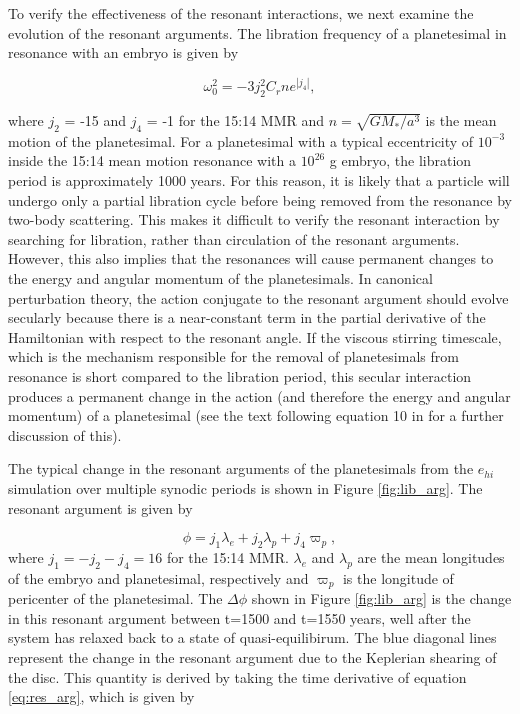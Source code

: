 To verify the effectiveness of the resonant interactions, we next examine the evolution of the resonant arguments. The libration 
frequency of a planetesimal in resonance with an embryo is given by \cite{murray00}

\begin{equation}\label{eq:lib_period}
    \omega_{0}^{2} = -3 j_{2}^{2} C_{r} n e^{\left| j_{4} \right|},
\end{equation}


\noindent where $j_{2}$ = -15 and $j_{4}$ = -1 for the 15:14 MMR and $n = \sqrt{G M_{*} / a^{3}}$ is the mean motion of the 
planetesimal. For a planetesimal with a typical eccentricity of $10^{-3}$ inside the 15:14 mean motion resonance with a 
$10^{26}$ g embryo, the libration period is approximately 1000 years. For this reason, it is likely that a particle will undergo only 
a partial libration cycle before being removed from the resonance by two-body scattering. This makes it difficult to verify the 
resonant interaction by searching for libration, rather than circulation of the resonant arguments. However, this also implies that 
the resonances will cause permanent changes to the energy and angular momentum of the planetesimals. In canonical 
perturbation theory, the action conjugate to the resonant argument should evolve secularly because there is a near-constant 
term in the partial derivative of the Hamiltonian with respect to the resonant angle. If the viscous stirring timescale, which is the 
mechanism responsible for the removal of planetesimals from resonance is short compared to the libration period, this secular 
interaction produces a permanent change in the action (and therefore the energy and angular momentum) of a planetesimal 
(see the text following equation 10 in \cite{weinberg07a} for a further discussion of this).

The typical change in the resonant arguments of the planetesimals from the $e_{hi}$ simulation over multiple synodic periods is 
shown in Figure \ref{fig:lib_arg}. The resonant argument is given by \cite{murray00}

\begin{equation}\label{eq:res_arg}
    \phi = j_{1} \lambda_{e} + j_{2} \lambda_{p} + j_{4} \varpi_{p},
\end{equation} where $j_{1} = -j_{2} - j_{4} = 16$ for the 15:14 MMR. $\lambda_{e}$ and $\lambda_{p}$ are the mean longitudes 
of the embryo and planetesimal, respectively and $\varpi_{p}$ is the longitude of pericenter of the planetesimal. The $\Delta 
\phi$ shown in Figure \ref{fig:lib_arg} is the change in this resonant argument between t=1500 and t=1550 years, well after the 
system has relaxed back to a state of quasi-equilibirum. The blue diagonal lines represent the change in the resonant argument 
due to the Keplerian shearing of the disc. This quantity is derived by taking the time derivative of equation \ref{eq:res_arg},  
which is given by

